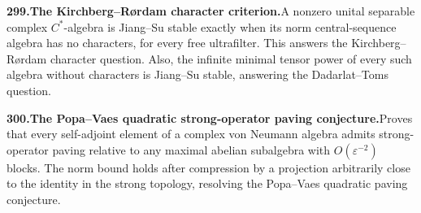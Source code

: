 \documentclass[11pt,a4paper]{article}
\begin{document}
  \par \begin{minipage}{\linewidth}
  \fontsize{10.5}{12.6}\selectfont\RaggedRight
  \hypertarget{result 299}{}
  {\bfseries\textcolor{muted}{299.}\enspace The Kirchberg--R\o rdam character criterion.}\enspace A nonzero unital separable complex $C^*$-algebra is Jiang--Su stable exactly when its norm central-sequence algebra has no characters, for every free ultrafilter. This answers the Kirchberg--R\o rdam character question. Also, the infinite minimal tensor power of every such algebra without characters is Jiang--Su stable, answering the Dadarlat--Toms question.\par
  \end{minipage}\par\vspace{5pt}



  \par \begin{minipage}{\linewidth}
  \fontsize{10.5}{12.6}\selectfont\RaggedRight
  \hypertarget{result 300}{}
  {\bfseries\textcolor{muted}{300.}\enspace The Popa--Vaes quadratic strong-operator paving conjecture.}\enspace Proves that every self-adjoint element of a complex von Neumann algebra admits strong-operator paving relative to any maximal abelian subalgebra with $O(\varepsilon^{-2})$ blocks. The norm bound holds after compression by a projection arbitrarily close to the identity in the strong topology, resolving the Popa--Vaes quadratic paving conjecture.\par
  \end{minipage}\par\vspace{5pt}
\end{document}
